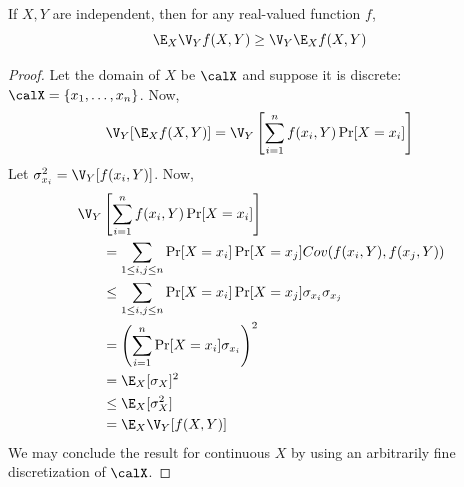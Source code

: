 \begin{lemma}\label{chap1-lem:fact}
If $X,Y$ are independent, then for any real-valued function $f$,
\[
\E_X \V_Y f(X,Y) \geq \V_Y \E_X f(X,Y)
\]
\end{lemma}
\begin{proof}
Let the domain of $X$ be $\calX$ and suppose it is discrete: $\calX = \{x_1, \ldots, x_n\}$. Now,
\[
\V_Y [\E_X f(X,Y)] = \V_Y\left[\sum_{i=1}^n f(x_i,Y) \Pr[X=x_i]\right]
\]
Let $\sigma_{x_i}^2 = \V_Y[f(x_i,Y)]$. Now,
\begin{align*}
&\: \V_Y\left[\sum_{i=1}^n f(x_i,Y) \Pr[X=x_i]\right] \\
&\hspace{2em}= \sum_{1 \leq i,j \leq n} \Pr[X=x_i]\Pr[X=x_j] Cov(f(x_i,Y), f(x_j,Y)) \\
&\hspace{2em}\leq \sum_{1 \leq i,j \leq n} \Pr[X=x_i]\Pr[X=x_j] \sigma_{x_i} \sigma_{x_j} \\
&\hspace{2em}= \left(\sum_{i=1}^n \Pr[X=x_i] \sigma_{x_i}\right)^2 \\
&\hspace{2em}= \E_X[\sigma_X]^2 \\
&\hspace{2em}\leq \E_X[\sigma_X^2] \\
&\hspace{2em}= \E_X \V_Y[f(X,Y)]
\end{align*}
We may conclude the result for continuous $X$ by using an arbitrarily fine discretization of $\calX$.
\end{proof}

